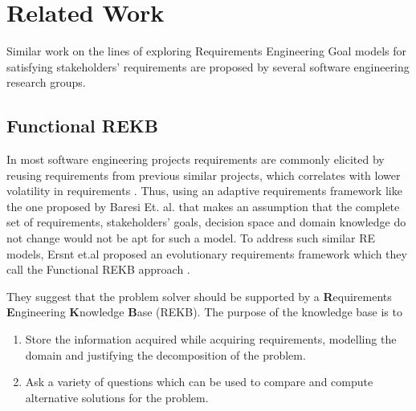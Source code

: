 \chapter{Related Work}
\label{chap:relwork}

Similar work on the lines of exploring Requirements Engineering Goal models for satisfying stakeholders' requirements are proposed by several software engineering research groups.

\section{Functional REKB}
\label{sec:rekb}

In most software engineering projects requirements are commonly elicited by reusing requirements from previous similar projects, which correlates with lower volatility in requirements \cite{ferreira11}. Thus, using an adaptive requirements framework like the one proposed by Baresi Et. al. \cite{baresi10} that makes an assumption that the complete set of requirements, stakeholders' goals, decision space and domain knowledge do not change would not be apt for such a model. To address such similar RE models, Ersnt et.al proposed an evolutionary requirements framework which they call the Functional REKB approach \cite{ernst11}.

They suggest that the problem solver should be supported by a \textbf{R}equirements \textbf{E}ngineering \textbf{K}nowledge \textbf{B}ase (REKB). The purpose of the knowledge base is to

\begin{enumerate}
    \item Store the information acquired while acquiring requirements, modelling the domain and justifying the decomposition of the problem.
    \item Ask a variety of questions which can be used to compare and compute alternative solutions for the problem.
\end{enumerate}

